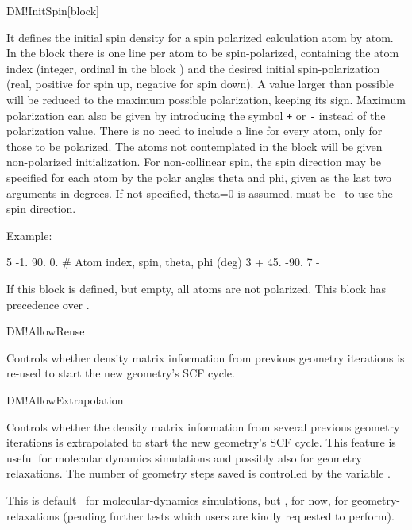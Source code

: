 \begin{fdfentry}{DM!InitSpin}[block]
  
  It defines the initial spin density for a spin polarized calculation
  atom by atom.  In the block there is one line per atom to be
  spin-polarized, containing the atom index (integer, ordinal in the
  block ) and the desired
  initial spin-polarization (real, positive for spin up, negative for
  spin down). A value larger than possible will be reduced to the
  maximum possible polarization, keeping its sign.  Maximum
  polarization can also be given by introducing the symbol \texttt{+}
  or \texttt{-} instead of the polarization value.  There is no need
  to include a line for every atom, only for those to be
  polarized. The atoms not contemplated in the block will be given
  non-polarized initialization.  For non-collinear spin, the spin
  direction may be specified for each atom by the polar angles theta
  and phi, given as the last two arguments in degrees. If not
  specified, theta=0 is assumed.    must be
  \fdftrue\ to use the spin direction.

  Example:
  \begin{fdfexample}
        5  -1.   90.   0.   # Atom index, spin, theta, phi (deg)
        3   +    45. -90.
        7   -
  \end{fdfexample}

  If this block is defined, but empty, all atoms are not polarized.
  This block has precedence over .

\end{fdfentry}

\begin{fdflogicalT}{DM!AllowReuse}

  Controls whether density matrix information from previous geometry
  iterations is re-used to start the new geometry's SCF cycle.
  
\end{fdflogicalT}

\begin{fdflogicalT}{DM!AllowExtrapolation}

  Controls whether the density matrix information from several
  previous geometry iterations is extrapolated to start the new
  geometry's SCF cycle.  This feature is useful for molecular dynamics
  simulations and possibly also for geometry relaxations.  The number
  of geometry steps saved is controlled by the variable
  .

  This is default \fdftrue\ for molecular-dynamics simulations, but
  \fdffalse, for now, for geometry-relaxations (pending further tests
  which users are kindly requested to perform).

\end{fdflogicalT}


